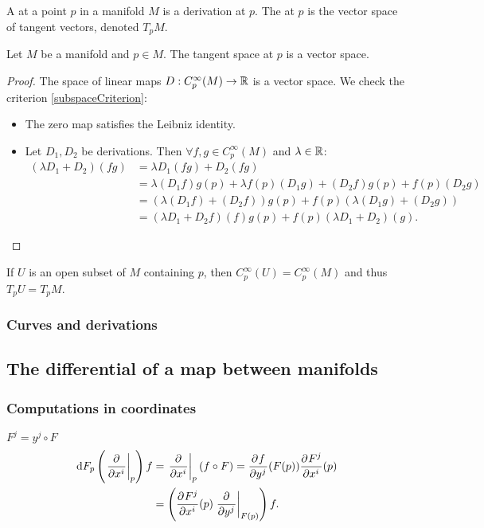 \begin{definition}
A  at a point $p$ in a manifold $M$ is a derivation at $p$. The  at $p$ is the vector space of tangent vectors, denoted $T_pM$.
\end{definition}
\begin{lemma}
Let $M$ be a manifold and $p\in M$. The tangent space at $p$ is a vector space.
\end{lemma}
\begin{proof}
The space of linear maps $D:C^\infty_p(M)\to \mathbb{R}$ is a vector space. We check the criterion \ref{subspaceCriterion}:
\begin{itemize}
\item The zero map satisfies the Leibniz identity.
\item Let $D_1,D_2$ be derivations. Then $\forall f,g\in C^\infty_p(M)$ and $\lambda\in\mathbb{R}$:
\begin{align*}
(\lambda D_1 + D_2)(fg) &= \lambda D_1(fg) + D_2(fg) \\
&= \lambda (D_1f)g(p) + \lambda f(p)(D_1g) + (D_2f)g(p) + f(p)(D_2g) \\
&= (\lambda (D_1f) + (D_2f))g(p) + f(p)(\lambda(D_1g)+ (D_2g)) \\
&= (\lambda D_1 + D_2f)(f)g(p) + f(p)(\lambda D_1+ D_2)(g).
\end{align*}
\end{itemize}
\end{proof}

If $U$ is an open subset of $M$ containing $p$, then $C^\infty_p(U) = C^\infty_p(M)$ and thus $T_pU = T_pM$.

\subsubsection{Curves and derivations}

\subsection{The differential of a map between manifolds}

\subsubsection{Computations in coordinates}
$F^j = y^j\circ F$
\begin{align*}
\operatorname{d \!}{F}_p \left(\left. \frac{\partial{^{}}}{\partial{{x^i}^{}}} \right|_p\right)f &= \left. \frac{\partial{^{}}}{\partial{{x^i}^{}}} \right|_p(f\circ F) =  \frac{\partial{^{}}f}{\partial{{y^j}^{}}} (F(p)) \frac{\partial{^{}}F^j}{\partial{{x^i}^{}}} (p) \\
&= \left( \frac{\partial{^{}}F^j}{\partial{{x^i}^{}}} (p)\left. \frac{\partial{^{}}}{\partial{{y^j}^{}}} \right|_{F(p)}\right)f.
\end{align*}

